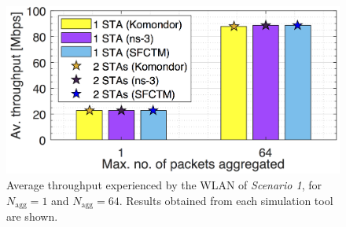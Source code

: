 \documentclass{article}
\begin{document}
	\begin{figure}[t]
		\centering		
		\includegraphics[width=0.8\columnwidth]{results_scenario_1.png}
		\caption{Average throughput experienced by the WLAN of \textit{Scenario 1}, for $N_{\text{agg}} = 1$ and $N_{\text{agg}} = 64$. Results obtained from each simulation tool are shown.}
		\label{fig:results_simple_scenarios}
	\end{figure}
	
\end{document}
